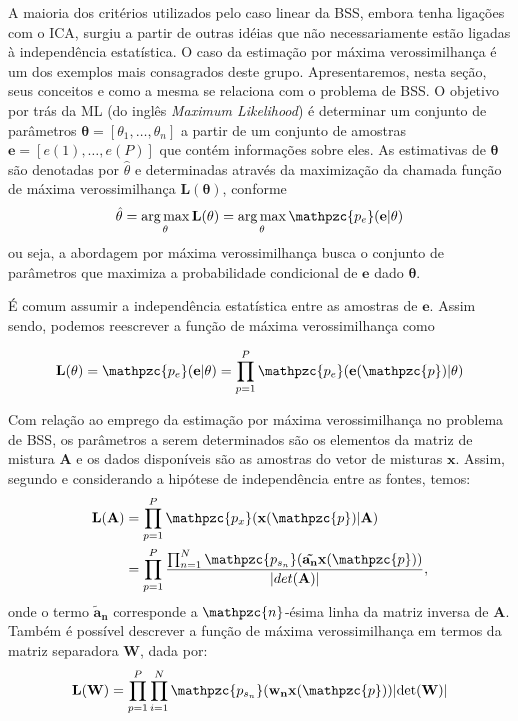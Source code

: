     A maioria dos critérios utilizados pelo caso linear da BSS, embora tenha ligações com o ICA, surgiu a partir de outras idéias que não necessariamente estão ligadas à independência estatística. O caso da estimação por máxima verossimilhança é um dos exemplos mais consagrados deste grupo. Apresentaremos, nesta seção, seus conceitos e como a mesma se relaciona com o problema de BSS. 
    O objetivo por trás da ML (do inglês \textit{Maximum Likelihood}) é determinar um conjunto de parâmetros $\mathbf{\theta} = [\theta_1, \dots, \theta_n]$ a partir de um conjunto de amostras $\mathbf{e} = [e(1), \dots, e(P)]$ que contém informações sobre eles. As estimativas de $\mathbf{\theta}$ são denotadas por $\hat{\theta}$ e determinadas através da maximização da chamada função de máxima verossimilhança $\mathbf{L(\theta)}$, conforme    
    \begin{equation}\label{eq:argmax}
    \hat{\theta} = \operatorname*{arg\,max}_{\theta} \mathbf{L(\theta)}
    = \operatorname*{arg\,max}_{\theta}
    \mathpzc{p_e}(\mathbf{e} | \mathbf{\theta})
    \end{equation} ou seja, a abordagem por máxima verossimilhança busca o conjunto de parâmetros que maximiza a probabilidade condicional de $\mathbf{e}$ dado $\mathbf{\theta}$.
    
    É comum assumir a independência estatística entre as amostras de $\mathbf{e}$. Assim sendo, podemos reescrever a função de máxima verossimilhança como
    
    \begin{equation}\label{eq:argmax2}
        \mathbf{L(\theta)}
        =\mathpzc{p_e}(\mathbf{e} | \mathbf{\theta})
        =\prod_{p=1}^P \mathpzc{p_e}(\mathbf{e}(\mathpzc{p}) | \mathbf{\theta})
    \end{equation}

    Com relação ao emprego da estimação por máxima verossimilhança no problema de BSS, os parâmetros a serem determinados são os elementos da matriz de mistura $\mathbf{A}$ e os dados disponíveis são as amostras do vetor de misturas $\mathbf{x}$. Assim, segundo \cite{cetrallimit} e considerando a hipótese de independência entre as fontes, temos:
        \begin{equation}\label{eq:verobss}
          \begin{split}
         \mathbf{L(A)} & =\prod_{p=1}^P \mathpzc{p_x}(\mathbf{x}(\mathpzc{p}) | \mathbf{A})\\
                                & =\prod_{p=1}^P\frac{\prod_{n=1}^N\mathpzc{p_{s_n}}(\mathbf{\tilde{a_n}}\mathbf{x}(\mathpzc{p}))}{| det(\mathbf{A}) |},
        \end{split}
    \end{equation} 
    onde o termo $\mathbf{\tilde{a}_n}$ corresponde a $\mathpzc{n}$-ésima linha da matriz inversa de $\mathbf{A}$. Também é possível descrever a função de máxima verossimilhança em termos da matriz separadora $\mathbf{W}$, dada por:
    \begin{equation}
        \label{eq:veroForW}
        \mathbf{L(W)} = \prod_{p=1}^{P}\prod_{i=1}^N\mathpzc{p_{s_n}}(\mathbf{w_nx}(\mathpzc{p}))|\text{det}(\mathbf{W})|
    \end{equation}
  

